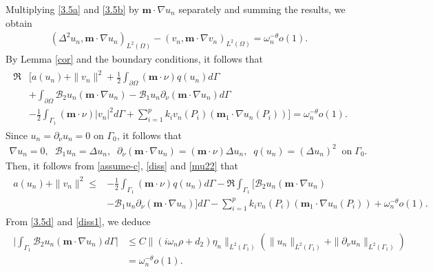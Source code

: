 \documentclass[twoside]{article}
\theoremstyle{noparens}
\theoremstyle{definition}
\numberwithin{equation}{section}
\numberwithin{figure}{section}
\begin{document}
Multiplying \eqref{3.5a} and \eqref{3.5b} by $\mathbf{m}\cdot\nabla u_n$ separately and summing the results, we obtain
\begin{align} \label{mu1}
	(\Delta^{2}u_{n},\mathbf{m}\cdot\nabla u_{n})_{L^2(\Omega)}-(v_{n},\mathbf{m}\cdot\nabla v_{n})_{L^2(\Omega)} =\omega_{n}^{-\theta}o(1).
\end{align}
By Lemma \ref{cor} and the boundary conditions, it follows that
\begin{align}\label{mu22}
	\begin{split}
		\Re&\bigg[a(u_{n}) + \|v_n\|^2
		+\frac{1}{2}\int_{\partial\Omega}(\mathbf{m}\cdot\nu)q(u_{n})d\Gamma\\
		&
		+\int_{\partial\Omega}\mathcal{B}_{2}u_{n} {(\mathbf{m}\cdot\nabla u_{n})}
		-\mathcal{B}_{1}u_{n} {\partial_{\nu}(\mathbf{m}\cdot\nabla u_{n})}d\Gamma\\
		&
		-\frac{1}{2}\int_{\Gamma_1}(\mathbf{m}\cdot\nu)|v_{n}|^{2}d\Gamma+\sum_{i=1}^{p}k_i v_n(P_i)
		({\mathbf{m}_1\cdot\nabla u_n(P_i)})
		\bigg]=\omega_{n}^{-\theta}o(1).
	\end{split}
\end{align}
Since $u_n=\partial_{\nu}u_n=0$ on $\Gamma_0$, it follows that
\begin{align}
	\nabla u_n =0 ,\;\;\mathcal B_1 u_n = \Delta u_n,\;\;\partial_{\nu}(\mathbf m\cdot\nabla u_n) = (\mathbf m\cdot \nu)\Delta u_n,\;\;q(u_n)=(\Delta u_n)^2\;\;\text{on}\;\Gamma_0.
\end{align}
Then, it follows from \eqref{assume-c}, \eqref{diss} and  \eqref{mu22} that
\begin{align}\label{mu2}
	\begin{split}
		a(u_{n}) + \|v_n\|^2 \le &
		-\frac{1}{2}\int_{\Gamma_1}(\mathbf{m}\cdot\nu)q(u_{n})d\Gamma
		- \Re \int_{\Gamma_1} \big[\mathcal{B}_{2}u_{n} {(\mathbf{m}\cdot\nabla u_{n})} \\
		&
		- \mathcal{B}_{1}u_{n} {\partial_{\nu}(\mathbf{m}\cdot\nabla u_{n})}\big]d\Gamma
		- \sum_{i=1}^{p}k_i v_n(P_i)
		({\mathbf{m}_1\cdot\nabla u_n(P_i)})
		+\omega_{n}^{-\theta}o(1).
	\end{split}
\end{align}
From  \eqref{3.5d} and \eqref{diss1}, we deduce
\begin{align}
	\label{b1}
\begin{split}
		\Big|\int_{\Gamma_{1}}\mathcal{B}_{2}u_{n} {(\mathbf{m}\cdot\nabla u_{n})}d\Gamma
	\Big|
	&\leq C\|(i\omega_n \rho +d_2)\eta_{n}\|_{L^2(\Gamma_1)}(\|u_n\|_{L^2(\Gamma_1)}+\| \partial_\nu u_n\|_{L^2(\Gamma_1)})\\
	&  = \omega_n^{-\theta}o(1).
\end{split}
\end{align}
\end{document}
